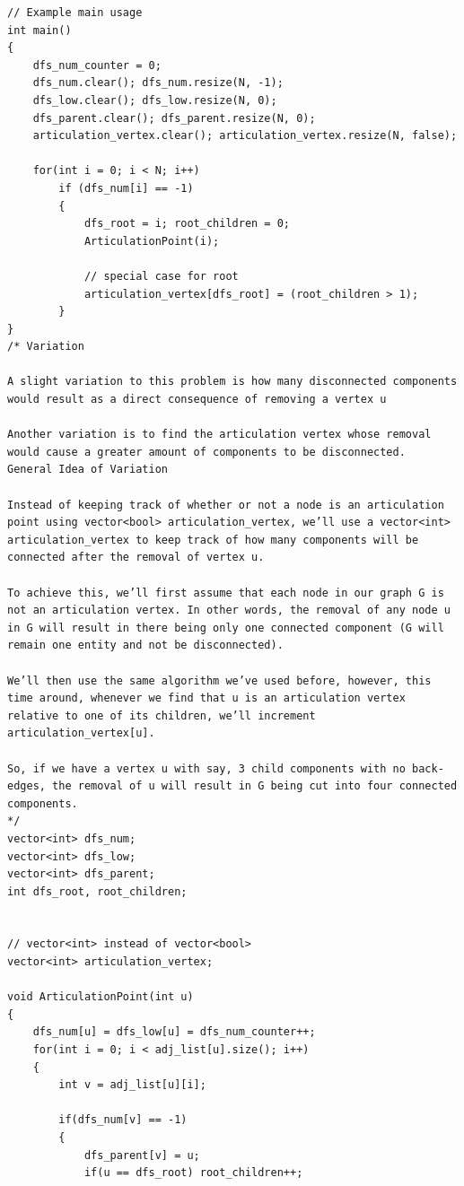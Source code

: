 \documentclass[8pt, a4paper, oneside, twocolumn]{extarticle}
\begin{document}
\begin{itemize}
\begin{verbatim}
// Example main usage
int main() 
{
    dfs_num_counter = 0;
    dfs_num.clear(); dfs_num.resize(N, -1);
    dfs_low.clear(); dfs_low.resize(N, 0);
    dfs_parent.clear(); dfs_parent.resize(N, 0);
    articulation_vertex.clear(); articulation_vertex.resize(N, false);

    for(int i = 0; i < N; i++)
        if (dfs_num[i] == -1)
        {
            dfs_root = i; root_children = 0;
            ArticulationPoint(i);
            
            // special case for root
            articulation_vertex[dfs_root] = (root_children > 1);
        }
}
/* Variation

A slight variation to this problem is how many disconnected components would result as a direct consequence of removing a vertex u

Another variation is to find the articulation vertex whose removal would cause a greater amount of components to be disconnected.
General Idea of Variation

Instead of keeping track of whether or not a node is an articulation point using vector<bool> articulation_vertex, we’ll use a vector<int> articulation_vertex to keep track of how many components will be connected after the removal of vertex u.

To achieve this, we’ll first assume that each node in our graph G is not an articulation vertex. In other words, the removal of any node u in G will result in there being only one connected component (G will remain one entity and not be disconnected).

We’ll then use the same algorithm we’ve used before, however, this time around, whenever we find that u is an articulation vertex relative to one of its children, we’ll increment articulation_vertex[u].

So, if we have a vertex u with say, 3 child components with no back-edges, the removal of u will result in G being cut into four connected components.
*/
vector<int> dfs_num;
vector<int> dfs_low;
vector<int> dfs_parent;
int dfs_root, root_children;


// vector<int> instead of vector<bool>
vector<int> articulation_vertex;

void ArticulationPoint(int u)
{
    dfs_num[u] = dfs_low[u] = dfs_num_counter++;
    for(int i = 0; i < adj_list[u].size(); i++)
    {
        int v = adj_list[u][i];
        
        if(dfs_num[v] == -1)
        {
            dfs_parent[v] = u;
            if(u == dfs_root) root_children++;


\end{verbatim}
\end{itemize}
\end{document}
